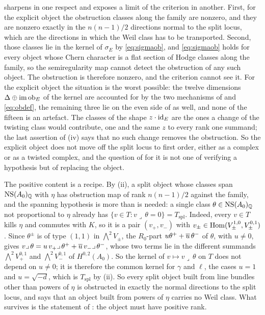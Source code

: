 \begin{remark}\label{rem:obstructionmeaning}
 sharpens \cite[Remark~9.21]{paperI} in one
respect and exposes a limit of the criterion in another. First, for the
explicit object the obstruction classes along the family are nonzero, and
they are nonzero exactly in the $n(n-1)/2$ directions normal to the split
locus, which are the directions in which the Weil class has to be
transported. Second, those classes lie in the kernel of $\sigma_{E}$ by
\eqref{eq:sigmaob}, and \eqref{eq:sigmaob} holds for every object whose
Chern character is a flat section of Hodge classes along the family, so the
semiregularity map cannot detect the obstruction of any such object. The
obstruction is therefore nonzero, and the criterion cannot see it. For
the explicit object the
situation is the worst possible: the twelve dimensions
$\Delta\oplus\operatorname{im}\operatorname{ob}_{E}$ of the kernel are accounted for by the two
mechanisms of \cite[Corollary~9.18]{paperI} and \eqref{eq:obdef}, the remaining
three lie on the even side of \cite[Corollary~9.8]{paperI} as well, and none of
the fifteen is an artefact. The classes of the shape $z\cdot\operatorname{id}_{E}$ are the
ones a change of the twisting class would contribute, one and the same $z$
to every rank one summand; the last assertion of (iv) says that no such
change removes the obstruction. So the explicit object does not move off the
split locus to first order, either as a complex or as a twisted complex, and
the question of \cite[Question~15.13]{paperI} for it is not one of verifying a
hypothesis but of replacing the object.

The positive content is a recipe. By (ii), a split object whose classes
span $\mathrm{NS}(A_{0})_{\mathbb{Q}}$ with $\eta$ has obstruction map of rank
$n(n-1)/2$ against the family, and the spanning hypothesis is more than is
needed: a single class $\theta\in\mathrm{NS}(A_{0})_{\mathbb{Q}}$ not proportional to
$\eta$ already has $\{v\in T:v\lrcorner\,\theta=0\}=T_{\mathrm{spl}}$.
Indeed, every $v\in T$ kills $\eta$ and commutes with $K$, so it is a pair
$(v_{+},v_{-})$ with $v_{\pm}\in\operatorname{Hom}(V_{\pm}^{1,0},V_{\pm}^{0,1})$. Since
$\theta^{\pm}$ is of type $(1,1)$ in $\bigwedge^{2}V_{\pm}$, the $R_{0}$-part
$u\theta^{+}+\overline{u}\,\theta^{-}$ of $\theta$, with $u\ne0$, gives
$v\lrcorner\,\theta=u\,v_{+}\lrcorner\,\theta^{+}+\overline{u}\,v_{-}\lrcorner\,\theta^{-}$,
whose two terms lie in the different summands $\bigwedge^{2}V_{+}^{0,1}$ and
$\bigwedge^{2}V_{-}^{0,1}$ of $H^{0,2}(A_{0})$. So the kernel of
$v\mapsto v\lrcorner\,\theta$ on $T$ does not depend on $u\ne0$; it is
therefore the common kernel for $\gamma$ and $\ell$, the cases $u=1$ and
$u=\sqrt{-d}$, which is $T_{\mathrm{spl}}$ by (ii). So every split object built from line bundles
other than powers of $\eta$ is obstructed in exactly the normal directions
to the split locus, and  says that an object built
from powers of $\eta$ carries no Weil class. What survives is the statement
of \cite[Remark~9.9]{paperI}: the object must have positive rank.
\end{remark}

